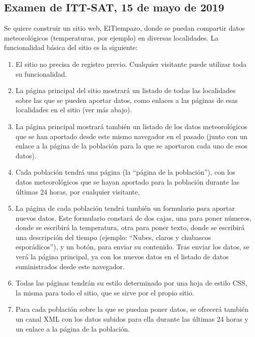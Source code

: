 \subsection{Examen de ITT-SAT, 15 de mayo de 2019}

Se quiere construir un sitio web, ElTiempazo, donde se puedan compartir datos meteorológicos (temperaturas, por ejemplo) en diversas localidades. La funcionalidad básica del sitio es la siguiente:

\begin{enumerate}
\item El sitio no precisa de registro previo. Cualquier visitante puede utilizar toda su funcionalidad.

\item La página principal del sitio mostrará un listado de todas las localidades sobre las que se pueden aportar datos, como enlaces a las páginas de esas localidades en el sitio (ver más abajo).

\item La página principal mostrará también un listado de los datos meteorológicos que se han aportado desde este mismo navegador en el pasado (junto con un enlace a la página de la población para la que se aportaron cada uno de esos datos). 
  
\item Cada población tendrá una página (la ``página de la población''), con los datos meteorológicos que se hayan aportado para la población durante las últimas 24 horas, por cualquier visitante.

\item La página de cada población tendrá también un formulario para aportar nuevos datos. Este formulario constará de dos cajas, una para poner números, donde se escribirá la temperatura, otra para poner texto, donde se escribirá una descripción del tiempo (ejemplo: ``Nubes, claros y chubascos esporádicos''), y un botón, para enviar su contenido. Tras enviar los datos, se verá la página principal, ya con los nuevos datos en el listado de datos suministrados desde este navegador.

\item Todas las páginas tendrán su estilo determinado por una hoja de estilo CSS, la misma para todo el sitio, que se sirve por el propio sitio.

\item Para cada población sobre la que se puedan poner datos, se ofrecerá también un canal XML con los datos subidos para ella durante las últimas 24 horas y un enlace a la página de la población.
  
\end{enumerate}


